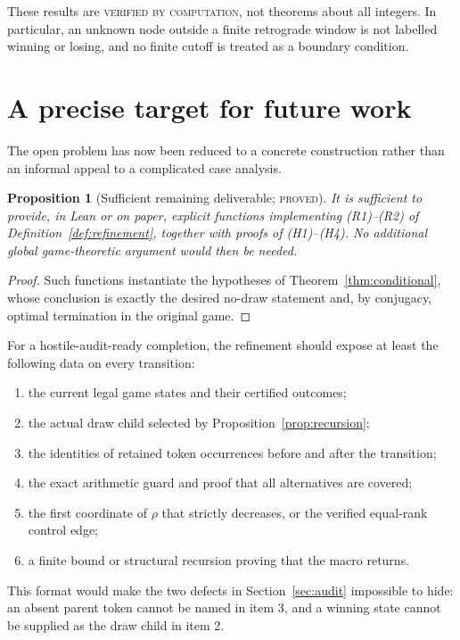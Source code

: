 \documentclass[11pt]{article}
\newtheorem{proposition}[theorem]{Proposition}
\theoremstyle{definition}
\newcommand{\proved}{\textsc{proved}}
\newcommand{\verified}{\textsc{verified by computation}}
\begin{document}
These results are \verified, not theorems about all integers.  In particular,
an unknown node outside a finite retrograde window is not labelled winning or
losing, and no finite cutoff is treated as a boundary condition.

\section{A precise target for future work}

The open problem has now been reduced to a concrete construction rather than
an informal appeal to a complicated case analysis.

\begin{proposition}[Sufficient remaining deliverable; \proved]
It is sufficient to provide, in Lean or on paper, explicit functions
implementing (R1)--(R2) of Definition~\ref{def:refinement}, together with
proofs of (H1)--(H4).  No additional global game-theoretic argument would then
be needed.
\end{proposition}

\begin{proof}
Such functions instantiate the hypotheses of
Theorem~\ref{thm:conditional}, whose conclusion is exactly the desired
no-draw statement and, by conjugacy, optimal termination in the original
game.
\end{proof}

For a hostile-audit-ready completion, the refinement should expose at least
the following data on every transition:

\begin{enumerate}
\item the current legal game states and their certified outcomes;
\item the actual draw child selected by Proposition~\ref{prop:recursion};
\item the identities of retained token occurrences before and after the
      transition;
\item the exact arithmetic guard and proof that all alternatives are covered;
\item the first coordinate of $\rho$ that strictly decreases, or the verified
      equal-rank control edge;
\item a finite bound or structural recursion proving that the macro returns.
\end{enumerate}

This format would make the two defects in Section~\ref{sec:audit} impossible
to hide: an absent parent token cannot be named in item 3, and a winning state
cannot be supplied as the draw child in item 2.
\end{document}
